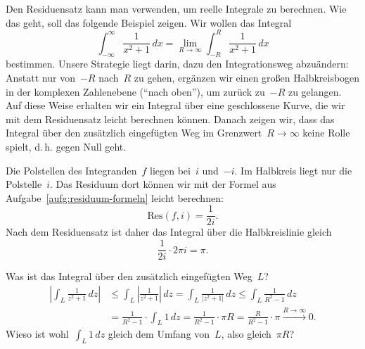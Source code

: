 \documentclass[twoside]{../zirkelblatt1415}
\theoremstyle{definition}
\theoremstyle{plain}
\theoremstyle{remark}
\newcommand{\Res}{\mathrm{Res}}
\begin{document}
Den Residuensatz kann man verwenden, um reelle Integrale zu berechnen. Wie das
geht, soll das folgende Beispiel zeigen. Wir wollen das Integral
\[ \int_{-\infty}^\infty \frac{1}{x^2+1} \,dx = \lim_{R \to \infty} \int_{-R}^R
\frac{1}{x^2+1} \,dx \]
bestimmen. Unsere Strategie liegt darin, dazu den Integrationsweg abzuändern:
Anstatt nur von~$-R$ nach~$R$ zu gehen, ergänzen wir einen großen
Halbkreisbogen in der komplexen Zahlenebene ("`nach oben"'), um zurück zu~$-R$
zu gelangen. Auf diese Weise erhalten wir ein Integral über eine geschlossene
Kurve, die wir mit dem Residuensatz leicht berechnen können. Danach zeigen wir,
dass das Integral über den zusätzlich eingefügten Weg im Grenzwert~$R \to
\infty$ keine Rolle spielt, d.\,h. gegen Null geht.

Die Polstellen des Integranden~$f$ liegen bei~$i$ und~$-i$. Im Halbkreis liegt nur
die Polstelle~$i$. Das Residuum dort können wir mit der Formel aus
Aufgabe~\ref{aufg:residuum-formeln} leicht berechnen:
\[ \Res(f, i) = \frac{1}{2 i}. \]
Nach dem Residuensatz ist daher das Integral über die Halbkreislinie gleich
\[ \frac{1}{2 i} \cdot 2\pi i = \pi. \]

Was ist das Integral über den zusätzlich eingefügten Weg~$L$?
\begin{align*}
  \left|\int_L \frac{1}{z^2+1} \,dz\right| &\leq
  \int_L \left| \frac{1}{z^2+1} \right| \,dz
  = \int_L \frac{1}{|z^2+1|} \,dz
  \leq \int_L \frac{1}{R^2-1} \,dz \\[0.5em]
  &= \frac{1}{R^2 - 1} \cdot \int_L 1 \,dz
  = \frac{1}{R^2 - 1} \cdot \pi R
  = \frac{R}{R^2 - 1} \cdot \pi \xrightarrow{R \to \infty} 0.
\end{align*}
Wieso ist wohl~$\int_L 1 \,dz$ gleich dem Umfang von~$L$, also gleich~$\pi R$?
\end{document}
